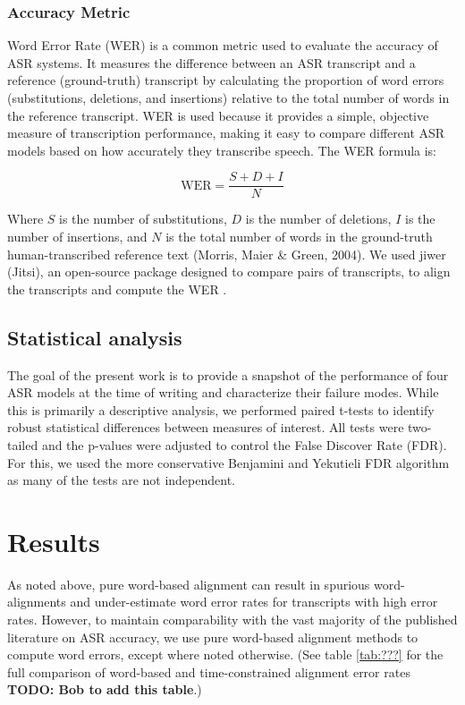 \documentclass{article}
\begin{document}
\subsubsection{Accuracy Metric}
Word Error Rate (WER) is a common metric used to evaluate the accuracy of ASR systems. It measures the difference between an ASR transcript and a reference (ground-truth) transcript by calculating the proportion of word errors (substitutions, deletions, and insertions) relative to the total number of words in the reference transcript. WER is used because it provides a simple, objective measure of transcription performance, making it easy to compare different ASR models based on how accurately they transcribe speech. The WER formula is: 

$$\text{WER} = \frac{S + D + I}{N}$$

Where $S$ is the number of substitutions, $D$ is the number of deletions, $I$ is the number of insertions, and $N$ is the total number of words in the ground-truth human-transcribed reference text (Morris, Maier \& Green, 2004). We used jiwer (Jitsi), an open-source package designed to compare pairs of transcripts, to align the transcripts and compute the WER \cite{jiweri2024}. 

\subsection{Statistical analysis}
The goal of the present work is to provide a snapshot of the performance of four ASR models at the time of writing and characterize their failure modes. While this is primarily a descriptive analysis, we  performed paired t-tests to identify robust statistical differences between measures of interest. All tests were two-tailed and the p-values were adjusted to control the False Discover Rate (FDR). For this, we used the more conservative Benjamini and Yekutieli FDR algorithm \cite{benjamini2001control} as many of the tests are not independent.


\section{Results}
As noted above, pure word-based alignment can result in spurious word-alignments and under-estimate word error rates for transcripts with high error rates. However, to maintain comparability with the vast majority of the published literature on ASR accuracy, we use pure word-based alignment methods to compute word errors, except where noted otherwise. (See table \ref{tab:???} for the full comparison of word-based and time-constrained alignment error rates \textbf{TODO: Bob to add this table}.)
\end{document}
